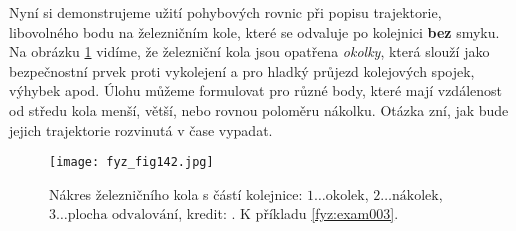   
Nyní si demonstrujeme užití pohybových rovnic při popisu trajektorie, libovolného bodu na 
železničním kole, které se odvaluje po kolejnici \textbf{bez} smyku. Na obrázku \ref{fyz:fig142} 
vidíme, že železniční kola jsou opatřena \emph{okolky}, která slouží jako bezpečnostní prvek proti 
vykolejení a pro hladký průjezd kolejových spojek, výhybek apod. Úlohu můžeme formulovat pro různé 
body, které mají vzdálenost od středu kola menší, větší, nebo rovnou poloměru nákolku. Otázka zní, 
jak bude jejich trajektorie rozvinutá v čase vypadat.

\begin{figure}[ht!]  %
  \centering
  \texttt{[image: fyz\_fig142.jpg]}
  \caption{Nákres železničního kola s částí kolejnice: \(1\ldots\text{okolek}\), \(2\ldots 
          \text{nákolek}\), \(3\ldots\text{plocha odvalování}\), kredit: \wikiOkolek. K příkladu 
          \ref{fyz:exam003}.}
  \label{fyz:fig142}
\end{figure}

